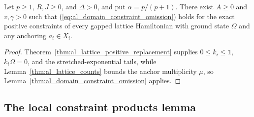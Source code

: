 \begin{lemma}
    \label{thm:al_lattice_constraint_omission}
    \leanok
    Let $p\ge1$, $R,J\ge0$, and $\Delta>0$, and put $\alpha=p/(p+1)$. There
    exist $A\ge0$ and $v,\gamma>0$ such that
    (\ref{eq:al_domain_constraint_omission}) holds for the exact positive
    constraints of every gapped lattice Hamiltonian with ground state $\Omega$
    and any anchoring $a_i\in X_i$.
\end{lemma}
\begin{proof}\leanok
    Theorem~\ref{thm:al_lattice_positive_replacement} supplies $0\le k_i\le\mathbb 1$,
    $k_i\Omega=0$, and the stretched-exponential tails, while
    Lemma~\ref{thm:al_lattice_counts} bounds the anchor multiplicity $\mu$, so
    Lemma~\ref{thm:al_domain_constraint_omission} applies.
\end{proof}

\subsection{The local constraint products lemma}

